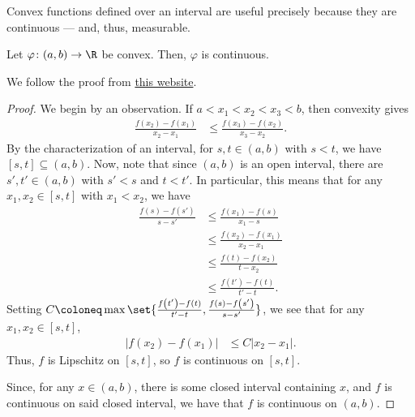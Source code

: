 \documentclass[10pt]{mypackage}
\begin{document}
Convex functions defined over an interval are useful precisely because they are continuous --- and, thus, measurable.
\begin{theorem}
  Let $\varphi\colon (a,b)\rightarrow \R$ be convex. Then, $\varphi$ is continuous.
\end{theorem}
We follow the proof from \href{https://unapologetic.wordpress.com/2008/04/15/convex-functions-are-continuous/}{this website}.
\begin{proof}
  We begin by an observation. If $a < x_1 < x_2 < x_3 < b$, then convexity gives
  \begin{align*}
    \frac{f\left( x_2 \right)- f\left( x_1 \right)}{x_2 - x_1} &\leq \frac{f\left( x_3 \right)-f\left( x_2 \right)}{x_3 - x_2}. \label{eq:convexity_fraction_inequality}\tag{\textasteriskcentered}
  \end{align*}
  By the characterization of an interval, for $s , t\in \left( a,b \right)$ with $s < t$, we have $\left[ s,t \right]\subseteq \left( a,b \right)$. Now, note that since $\left( a,b \right)$ is an open interval, there are $s',t'\in \left( a,b \right)$ with $s' < s$ and $t < t'$. In particular, this means that for any $x_1,x_2\in \left[ s,t \right]$ with $x_1 < x_2$, we have
  \begin{align*}
    \frac{f\left( s \right) - f\left( s' \right)}{s-s'} &\leq \frac{f\left( x_1 \right) - f\left( s \right)}{x_1 - s}\\
                                                        &\leq \frac{f\left( x_2 \right) - f\left( x_1 \right)}{x_2 - x_1}\\
                                                        &\leq  \frac{f\left( t \right) - f\left( x_2 \right)}{t-x_2}\\
                                                        &\leq \frac{f\left( t' \right)-f\left( t \right)}{t'-t}.
  \end{align*}
  Setting $C\coloneq \max\set{\frac{f\left( t' \right)-f\left( t \right)}{t'-t},\frac{f\left( s \right)-f\left( s' \right)}{s-s'}}$, we see that for any $x_1,x_2\in \left[ s,t \right]$,
  \begin{align*}
    \left\vert f\left( x_2 \right)-f\left( x_1 \right) \right\vert &\leq C \left\vert x_2 - x_1 \right\vert.
  \end{align*}
  Thus, $f$ is Lipschitz on $\left[ s,t \right]$, so $f$ is continuous on $\left[ s,t \right]$.\newline

  Since, for any $x\in \left( a,b \right)$, there is some closed interval containing $x$, and $f$ is continuous on said closed interval, we have that $f$ is continuous on $\left( a,b \right)$.
\end{proof}
\end{document}
